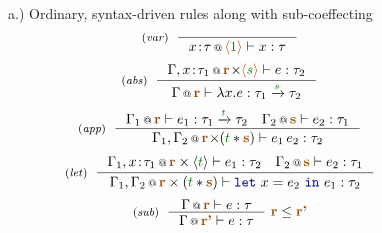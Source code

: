 \begin{figure}[t]
{\small a.) Ordinary, syntax-driven rules along with sub-coeffecting}
\begin{equation*}
\tyrule{var}{}
  {\coctx{x \!:\! \tau}{\alift{\cclrd{1}}} \vdash x : \tau} 
\end{equation*}
\begin{equation*}
\tyrule{abs}
  {\coctx{\Gamma, x \!:\! \tau_1}{\aclrd{\textbf{r}} \cons \alift{\cclrd{s}}} \vdash e : \tau_2}
  {\coctx{\Gamma}{\aclrd{\textbf{r}}} \vdash \lambda x . e : \tau_1 \xrightarrow{\cclrd{s}} \tau_2} 
\end{equation*}
\begin{equation*}
\tyrule{app}
  { \coctx{\Gamma_1}{\aclrd{\textbf{r}}} \vdash e_1 : \tau_1 \xrightarrow{\cclrd{t}} \tau_2 \quad 
    \coctx{\Gamma_2}{\aclrd{\textbf{s}}} \vdash e_2 : \tau_1}
  { \coctx{\Gamma_1, \Gamma_2}{\aclrd{\textbf{r}} \cons (\cclrd{t} \ast \aclrd{\textbf{s}})} \vdash e_1 \, e_2 : \tau_2} 
\end{equation*}
\begin{equation*}
\tyrule{let}
  { \coctx{\Gamma_1, x \!:\! \tau_1}{\aclrd{\textbf{r}} \times \langle{\cclrd{t}}\rangle} \vdash e_1 : \tau_2 \quad 
    \coctx{\Gamma_2}{\aclrd{\textbf{s}}} \vdash e_2 : \tau_1}
  {\coctx{\Gamma_1, \Gamma_2}{\aclrd{\textbf{r}} \times (\cclrd{t} \ast \aclrd{\textbf{s}})} \vdash \kvd{let}~x=e_2~\kvd{in}~e_1 : \tau_2}
\end{equation*}
\begin{equation*}
\tyrule{sub}
  {\coctx{\Gamma}{\aclrd{\textbf{r}}} \vdash e : \tau}
  {\coctx{\Gamma}{\aclrd{\textbf{r'}}} \vdash e : \tau}~\aclrd{\textbf{r}} \leq \aclrd{\textbf{r'}}
\end{equation*}
\vspace{0.5em}


\end{figure}
